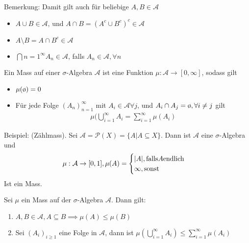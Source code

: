Bemerkung: Damit gilt auch für beliebige $A, B \in \mathcal{A}$
\begin{itemize}
\item $A \cup B \in \mathcal{A}$, und $A \cap B = \left(A^c \cup B^c\right)^c \in \mathcal{A}$
\item	$A \setminus B = A \cap B^c \in \mathcal{A}$
\item $ \bigcap{n=1}^{\infty} A_n \in \mathcal{A}$, falls $A_n \in \mathcal{A}, \forall n$
\end{itemize}

\begin{definition}[Mass]
Ein Mass auf einer $\sigma$-Algebra $ \mathcal{A}$ ist eine Funktion $\mu: \mathcal{A} \to [0,\infty]$, sodass gilt
\begin{itemize}
				\item $\mu(\es) = 0$
				\item Für jede Folge $ \left(A_{n}\right)_{n = 1}^{\infty}$ mit $A_i \in \mathcal{A} \forall j$, und $A_i \cap A_j = \es, \forall i \neq j$ gilt
		\begin{align*}
						\mu( \bigcup_{i=1}^{\infty}A_i = \sum_{i = 1}^{\infty} \mu(A_i) 
		\end{align*}
\end{itemize}
\end{definition}


Beispiel: (Zählmass). Sei $ \mathcal{A} = \mathcal{P}(X) = \{A| A \subseteq X\}$. Dann ist $ \mathcal{A}$ eine $\sigma$-Algebra und
\begin{align*}
\mu: \mathcal{A} \to [0,1], \mu(A) = 
\begin{cases}
	\vert A\vert, \text{falls} A \text{endlich}\\
	\infty, \text{sonst}
	\end{cases}
\end{align*}
Ist ein Mass.

\begin{lemma}[]
Sei $\mu$ ein Mass auf der $\sigma$-Algebra $ \mathcal{A}$. Dann gilt:
\begin{enumerate}
				\item $A, B \in \mathcal{A}, A \subseteq B \implies \mu(A) \leq \mu(B)$
				\item 	Sei $ \left(A_{i}\right)_{i \geq 1}$ eine Folge in $ \mathcal{A}$, dann ist $\mu\left( \bigcup_{i = 1}^{\infty} A_i\right) \leq \sum_{i = 1}^{\infty} \mu(A_i)$
\end{enumerate}
\end{lemma}

